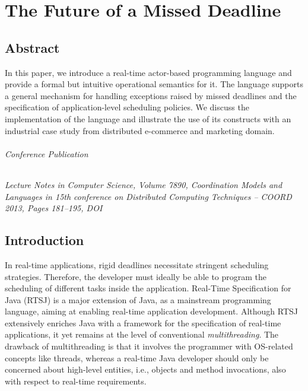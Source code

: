 
\chapter[The Future of a Missed Deadline]{The Future of a Missed Deadline}
% 
\label{ch:p01:ch02}
% 

\section*{Abstract}
In this paper, we introduce a real-time actor-based programming language
and provide a formal but intuitive  operational semantics for it. 
The language supports a general mechanism for handling exceptions raised by missed deadlines
and the specification of application-level scheduling policies.
We discuss  the implementation of the language and 
illustrate the use of its constructs with an industrial case study from distributed e-commerce and marketing domain. 

\subparagraph*{Conference Publication}
\emph{Lecture Notes in Computer Science, Volume 7890, Coordination Models and Languages in 15th conference on Distributed Computing Techniques -- COORD 2013, Pages 181--195, DOI }


\section{Introduction} \label{sec:introduction}

In real-time applications, rigid deadlines necessitate stringent scheduling strategies.
Therefore, the developer must ideally be able to program the scheduling of different tasks inside the application.
Real-Time Specification for Java (RTSJ) \cite{jsr1,jsr282} is a major extension of Java, as a mainstream programming language, aiming at enabling real-time application development. 
Although RTSJ extensively enriches Java with a framework for 
the  specification of real-time applications, 
it yet remains at the level of conventional \textit{multithreading}.
The drawback of multithreading is that it involves the programmer with OS-related concepts like threads, whereas a real-time Java developer should only be concerned about high-level entities, i.e., objects and method invocations, also with respect to 
real-time requirements.

